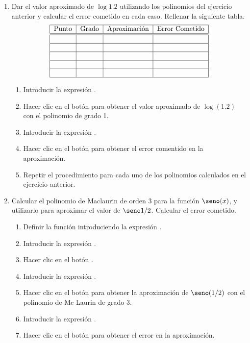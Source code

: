 \begin{enumerate}[leftmargin=*]
\item Dar el valor aproximado de $\log 1.2$ utilizando los polinomios del ejercicio anterior y calcular el error cometido en cada caso. 
Rellenar la siguiente tabla.
\[
\begin{tabular}{|c|c|c|c|}
\hline
Punto & Grado & Aproximación
& Error Cometido \\
\hline\hline
&  &  &  \\ \hline
&  &  &  \\ \hline
&  &  &  \\ \hline
&  &  &  \\ \hline
&  &  &  \\ \hline
\end{tabular}
\]

\begin{indication}
\begin{enumerate}
\item Introducir la expresión .
\item Hacer clic en el botón  para obtener el valor aproximado de $\log(1.2)$ con el polinomio de grado
1. 
\item Introducir la expresión .
\item Hacer clic en el botón  para obtener el error comentido en la aproximación.
\item Repetir el procedimiento para cada uno de los polinomios calculados en el ejercicio anterior. 
\end{enumerate}
\end{indication}

\item Calcular el polinomio de Maclaurin de orden 3 para la función $\seno(x)$, y utilizarlo para aproximar el valor de
$\seno 1/2$.
Calcular el error cometido.

\begin{indication}
\begin{enumerate}
\item Definir la función introduciendo la expresión . 
\item Introducir la expresión .
\item Hacer clic en el botón .
\item Introducir la expresión .
\item Hacer clic en el botón  para obtener la aproximación de $\seno(1/2)$ con el polinomio de Mc Laurin
de grado 3.
\item Introducir la expresión .
\item Hacer clic en el botón  para obtener el error en la aproximación.
\end{enumerate}
\end{indication}


\end{enumerate}
